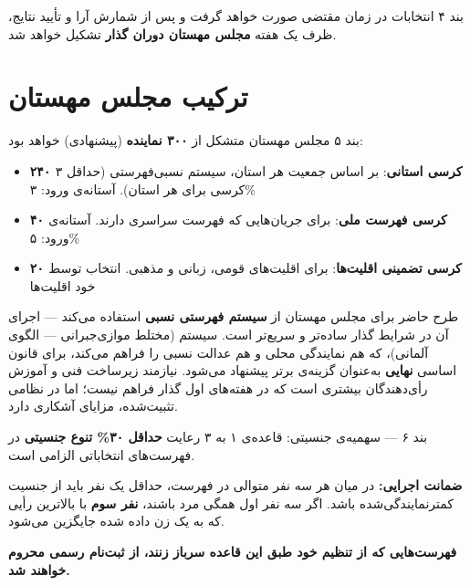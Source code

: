 \begin{bandbox}{بند ۴}
	انتخابات در زمان مقتضی صورت خواهد گرفت و پس از شمارش آرا و تأیید نتایج، ظرف یک هفته
	\textbf{مجلس مهستان دوران گذار} تشکیل خواهد شد.
\end{bandbox}

\section{ترکیب مجلس مهستان}

\begin{bandbox}{بند ۵}
	مجلس مهستان متشکل از \textbf{۳۰۰ نماینده} (پیشنهادی) خواهد بود:
	\begin{itemize}
		\item \textbf{۲۴۰ کرسی استانی}: بر اساس جمعیت هر استان، سیستم نسبی‌فهرستی
		(حداقل ۳ کرسی برای هر استان). آستانه‌ی ورود: ۳\%
		\item \textbf{۴۰ کرسی فهرست ملی}: برای جریان‌هایی که فهرست سراسری دارند.
		آستانه‌ی ورود: ۵\%
		\item \textbf{۲۰ کرسی تضمینی اقلیت‌ها}: برای اقلیت‌های قومی، زبانی و مذهبی.
		انتخاب توسط خود اقلیت‌ها
	\end{itemize}
\end{bandbox}

\begin{notebox}[title={\rl{یادداشت درباره‌ی سیستم انتخاباتی (\lr{MMP} در برابر فهرستی نسبی)}}]
	طرح حاضر برای مجلس مهستان از \textbf{سیستم فهرستی نسبی} استفاده می‌کند --- اجرای
	آن در شرایط گذار ساده‌تر و سریع‌تر است. سیستم \textbf{} (مختلط
	موازی‌جبرانی --- الگوی آلمانی)، که هم نمایندگی محلی و هم عدالت نسبی را فراهم
	می‌کند، برای قانون اساسی \textbf{نهایی} به‌عنوان گزینه‌ی برتر پیشنهاد می‌شود.
	 نیازمند زیرساخت فنی و آموزش رأی‌دهندگان بیشتری است که در هفته‌های اول
	گذار فراهم نیست؛ اما در نظامی تثبیت‌شده، مزایای آشکاری دارد.
\end{notebox}

\begin{bandbox}{بند ۶ --- سهمیه‌ی جنسیتی: قاعده‌ی ۱ به ۳}
	رعایت \textbf{حداقل ۳۰\% تنوع جنسیتی} در فهرست‌های انتخاباتی الزامی است.
	
	\textbf{ضمانت اجرایی:} در میان هر سه نفر متوالی در فهرست، حداقل یک نفر باید از
	جنسیت کمتر‌نمایندگی‌شده باشد. اگر سه نفر اول همگی مرد باشند، \textbf{نفر سوم}
	با بالاترین رأیی که به یک زن داده شده جایگزین می‌شود.
	
	\textbf{فهرست‌هایی که از تنظیم خود طبق این قاعده سرباز زنند، از ثبت‌نام رسمی
		محروم خواهند شد.}
\end{bandbox}

